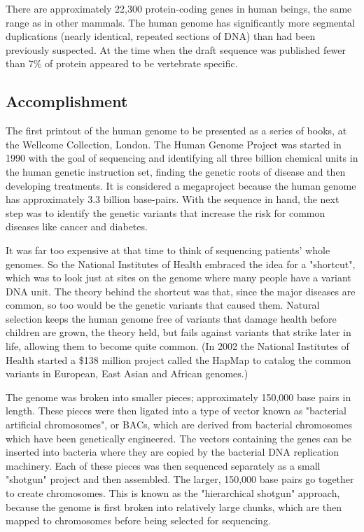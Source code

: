 \documentclass[12pt]{article}
\begin{document}
There are approximately 22,300 protein-coding genes in human beings, the same range as in other mammals. The human genome has significantly more segmental duplications (nearly identical, repeated sections of DNA) than had been previously suspected. At the time when the draft sequence was published fewer than 7\% of protein appeared to be vertebrate specific.


\subsection{Accomplishment}

The first printout of the human genome to be presented as a series of books, at the Wellcome Collection, London. The Human Genome Project was started in 1990 with the goal of sequencing and identifying all three billion chemical units in the human genetic instruction set, finding the genetic roots of disease and then developing treatments. It is considered a megaproject because the human genome has approximately 3.3 billion base-pairs. With the sequence in hand, the next step was to identify the genetic variants that increase the risk for common diseases like cancer and diabetes.

It was far too expensive at that time to think of sequencing patients' whole genomes. So the National Institutes of Health embraced the idea for a "shortcut", which was to look just at sites on the genome where many people have a variant DNA unit. The theory behind the shortcut was that, since the major diseases are common, so too would be the genetic variants that caused them. Natural selection keeps the human genome free of variants that damage health before children are grown, the theory held, but fails against variants that strike later in life, allowing them to become quite common. (In 2002 the National Institutes of Health started a \$138 million project called the HapMap to catalog the common variants in European, East Asian and African genomes.)

The genome was broken into smaller pieces; approximately 150,000 base pairs in length. These pieces were then ligated into a type of vector known as "bacterial artificial chromosomes", or BACs, which are derived from bacterial chromosomes which have been genetically engineered. The vectors containing the genes can be inserted into bacteria where they are copied by the bacterial DNA replication machinery. Each of these pieces was then sequenced separately as a small "shotgun" project and then assembled. The larger, 150,000 base pairs go together to create chromosomes. This is known as the "hierarchical shotgun" approach, because the genome is first broken into relatively large chunks, which are then mapped to chromosomes before being selected for sequencing.
\end{document}
